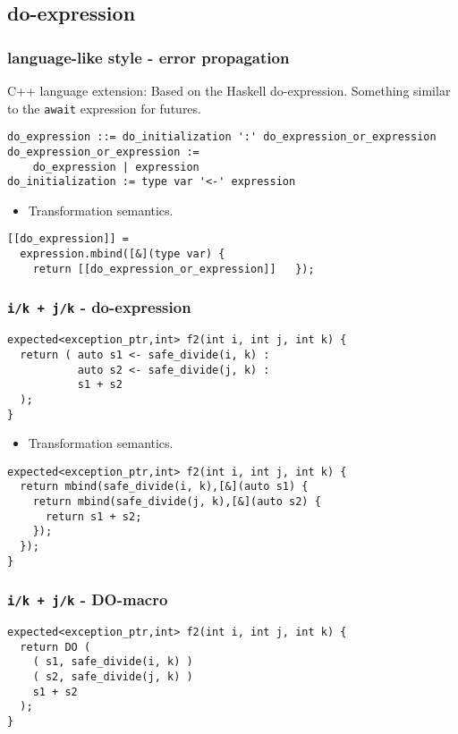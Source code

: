 \documentclass[xcolor=dvipsnames]{beamer}
\newcommand{\cpp}[1]{\lstinline{#1}}
\begin{document}
\subsection{do-expression}
\begin{frame}[fragile]
\frametitle{language-like style  - error propagation}
C++ language extension: Based on the Haskell do-expression. Something similar to the \cpp{await} expression for futures.  

\begin{lstlisting}
do_expression ::= do_initialization ':' do_expression_or_expression
do_expression_or_expression := 
    do_expression | expression
do_initialization := type var '<-' expression
\end{lstlisting}

\begin{itemize}
  \item Transformation semantics.
\end{itemize}

\begin{lstlisting}
[[do_expression]] =
  expression.mbind([&](type var) {
    return [[do_expression_or_expression]]   });
\end{lstlisting}

\end{frame}
\begin{frame}[fragile]
\frametitle{\cpp{i/k + j/k}  - do-expression}

\begin{lstlisting}
expected<exception_ptr,int> f2(int i, int j, int k) {
  return ( auto s1 <- safe_divide(i, k) :
           auto s2 <- safe_divide(j, k) :
           s1 + s2  
  );
}
\end{lstlisting}
\begin{itemize}
  \item Transformation semantics.
\end{itemize}
\begin{lstlisting}
expected<exception_ptr,int> f2(int i, int j, int k) {
  return mbind(safe_divide(i, k),[&](auto s1) {
    return mbind(safe_divide(j, k),[&](auto s2) {
      return s1 + s2;
    });
  }); 
}
\end{lstlisting}
\end{frame}

\begin{frame}[fragile]
\frametitle{\cpp{i/k + j/k}  - DO-macro}

\begin{lstlisting}
expected<exception_ptr,int> f2(int i, int j, int k) {
  return DO (
    ( s1, safe_divide(i, k) )
    ( s2, safe_divide(j, k) )
    s1 + s2 
  );
}
\end{lstlisting}

\end{frame}
\end{document}
